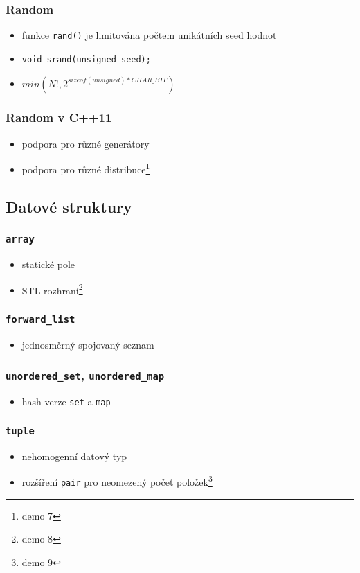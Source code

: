 \begin{frame} \frametitle{Random}
	\begin{itemize}
		\item funkce \texttt{rand()} je limitována počtem unikátních seed hodnot
		\item \texttt{void srand(unsigned seed);}
		\item $ min(N!,2^{sizeof(unsigned)*CHAR\_BIT}) $
	\end{itemize}
\end{frame}

\begin{frame} \frametitle{Random v C++11}
	\begin{itemize}
		\item podpora pro různé generátory
		\item podpora pro různé distribuce\footnote{demo 7}
	\end{itemize}
\end{frame}

\subsection{Datové struktury}

\begin{frame} \frametitle{\texttt{array}}
	\begin{itemize}
		\item statické pole
		\item STL rozhraní\footnote{demo 8}
	\end{itemize}
\end{frame}

\begin{frame} \frametitle{\texttt{forward\_list}}
	\begin{itemize}
		\item jednosměrný spojovaný seznam
	\end{itemize}
\end{frame}

\begin{frame} \frametitle{\texttt{unordered\_set}, \texttt{unordered\_map}}
	\begin{itemize}
		\item hash verze \texttt{set} a \texttt{map}
	\end{itemize}
\end{frame}

\begin{frame} \frametitle{\texttt{tuple}}
	\begin{itemize}
		\item nehomogenní datový typ
		\item rozšíření \texttt{pair} pro neomezený počet položek\footnote{demo 9}
	\end{itemize}
\end{frame}

